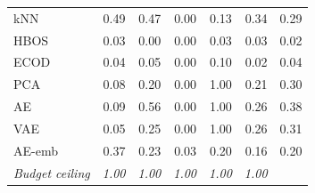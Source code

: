 \begin{table}[tbp]
\begin{tabular}{@{}lrrrrrr@{}}
kNN & 0.49 & 0.47 & 0.00 & 0.13 & 0.34 & 0.29 \\
HBOS & 0.03 & 0.00 & 0.00 & 0.03 & 0.03 & 0.02 \\
ECOD & 0.04 & 0.05 & 0.00 & 0.10 & 0.02 & 0.04 \\
PCA & 0.08 & 0.20 & 0.00 & 1.00 & 0.21 & 0.30 \\
AE & 0.09 & 0.56 & 0.00 & 1.00 & 0.26 & 0.38 \\
VAE & 0.05 & 0.25 & 0.00 & 1.00 & 0.26 & 0.31 \\
AE-emb & 0.37 & 0.23 & 0.03 & 0.20 & 0.16 & 0.20 \\
\textit{Budget ceiling} & \textit{1.00} & \textit{1.00} & \textit{1.00} & \textit{1.00} & \textit{1.00} & \\
\bottomrule
\end{tabular}
\end{table}

